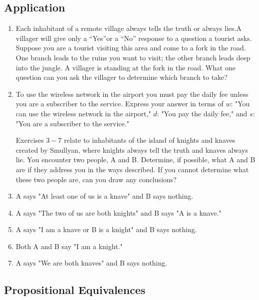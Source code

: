 \documentclass{sig-alternate-05-2015}
\begin{document}
\subsection{Application}

\begin{enumerate}
\item Each inhabitant of a remote village always tells the truth
or always lies.A villager will give only a \textquotedblleft Yes\textquotedblright or a \textquotedblleft No\textquotedblright
response to a question a tourist asks. Suppose you are a
tourist visiting this area and come to a fork in the road.
One branch leads to the ruins you want to visit; the other
branch leads deep into the jungle. A villager is standing
at the fork in the road. What one question can you ask the
villager to determine which branch to take?

\item To use the wireless network in the airport you must pay
the daily fee unless you are a subscriber to the service.
Express your answer in terms of $w$: "You can use the wireless
network in the airport," $d$: "You pay the daily fee,"
and $s$: "You are a subscriber to the service."

Exercises $3 - 7$ relate to inhabitants of the island of knights
and knaves created by Smullyan, where knights always tell
the truth and knaves always lie. You encounter two people,
A and B. Determine, if possible, what A and B are if they
address you in the ways described. If you cannot determine
what these two people are, can you draw any conclusions?
\item A says "At least one of us is a knave" and B says nothing.
\item A says "The two of us are both knights" and B says "A
is a knave."
\item A says "I am a knave or B is a knight" and B says nothing.
\item Both A and B say "I am a knight."
\item A says "We are both knaves" and B says nothing.

\end{enumerate}

\subsection{Propositional Equivalences}
\end{document}
